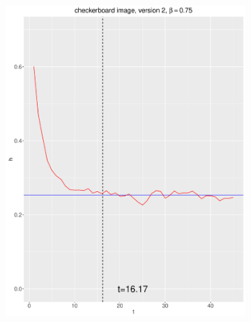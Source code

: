 \documentclass[12pt, oneside]{article}   	%
\begin{document}
\begin{figure}[H]
\begin{subfigure}[b]{0.475\textwidth}
            \includegraphics[width=\textwidth, height=0.32\textheight]{check_v2_75.pdf}
        \end{subfigure} \\
        \begin{subfigure}[b]{0.475\textwidth}
            \centering

\end{subfigure}
\end{figure}
\end{document}
